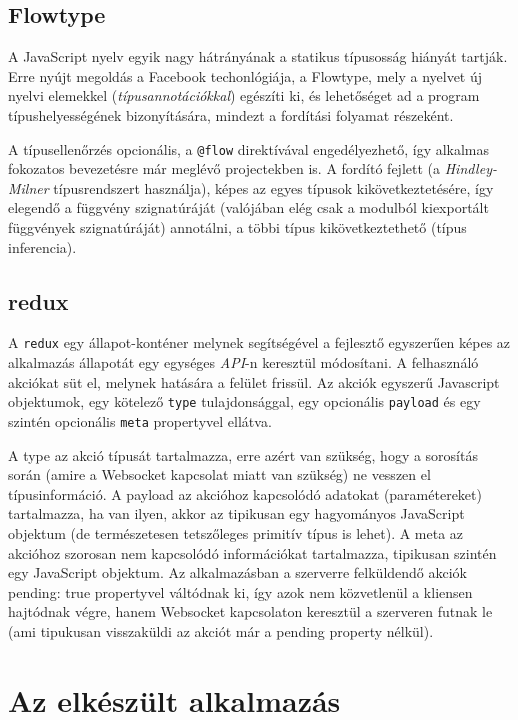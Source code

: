 \documentclass[11pt]{article}
\begin{document}
\subsection{Flowtype}

A JavaScript nyelv egyik nagy hátrányának a statikus típusosság hiányát tartják.
Erre nyújt megoldás a Facebook techonlógiája, a Flowtype\cite{flowtype}, mely a nyelvet
új nyelvi elemekkel (\emph{típusannotációkkal}) egészíti ki, és lehetőséget ad a program
típushelyességének bizonyítására, mindezt a fordítási folyamat részeként.

A típusellenőrzés opcionális, a \texttt{@flow} direktívával engedélyezhető, így alkalmas
fokozatos bevezetésre már meglévő projectekben is.
A fordító fejlett (a \emph{Hindley-Milner}\cite{hindley-milner} típusrendszert használja), képes az egyes típusok kikövetkeztetésére, így elegendő
a függvény szignatúráját (valójában elég csak a modulból kiexportált függvények
szignatúráját) annotálni, a többi típus kikövetkeztethető (típus inferencia).

\subsection{redux}

A \texttt{redux}\cite{redux} egy állapot-konténer melynek segítségével a fejlesztő egyszerűen képes
az alkalmazás állapotát egy egységes \emph{API}-n keresztül módosítani.
A felhasználó akciókat süt el, melynek hatására a felület frissül.
Az akciók egyszerű Javascript objektumok, egy kötelező \texttt{type} tulajdonsággal,
egy opcionális \texttt{payload} és egy szintén opcionális \texttt{meta} propertyvel ellátva.

A type az akció típusát tartalmazza, erre azért van szükség, hogy a sorosítás
során (amire a Websocket kapcsolat miatt van szükség) ne vesszen el
típusinformáció.
A payload az akcióhoz kapcsolódó adatokat (paramétereket) tartalmazza,
ha van ilyen, akkor az tipikusan egy hagyományos JavaScript objektum (de
természetesen tetszőleges primitív típus is lehet).
A meta az akcióhoz szorosan nem kapcsolódó információkat tartalmazza, tipikusan
szintén egy JavaScript objektum.
Az alkalmazásban a szerverre felküldendő akciók pending: true propertyvel
váltódnak ki, így azok nem közvetlenül a kliensen hajtódnak végre, hanem
Websocket kapcsolaton keresztül a szerveren futnak le (ami tipukusan visszaküldi az
akciót már a pending property nélkül).

\section{Az elkészült alkalmazás}
\end{document}
